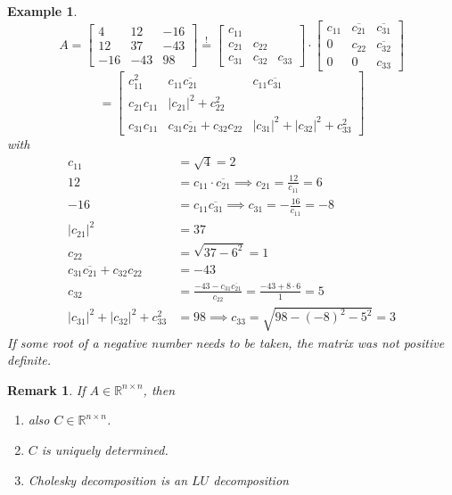\documentclass{article}
\newtheorem{example}{Example}  \numberwithin{example}{section}
\newtheorem{remark}{Remark}  \numberwithin{remark}{section}
\newcommand{\card}[1]{\left|#1\right|}
\begin{document}
\begin{example} %
  \[
    A = \begin{bmatrix} 4 & 12 & -16 \\ 12 & 37 & -43 \\ -16 & -43 & 98 \end{bmatrix}
    \overset!= \begin{bmatrix} c_{11} & & \\ c_{21} & c_{22} & \\ c_{31} & c_{32} & c_{33} \end{bmatrix} \cdot \begin{bmatrix} c_{11} & \overline{c_{21}} & \overline{c_{31}} \\ 0 & c_{22} & \overline{c_{32}} \\ 0 & 0 & c_{33} \end{bmatrix}
  \] \[
    = \begin{bmatrix} c_{11}^2 & c_{11} \overline{c_{21}} & c_{11} \overline{c_{31}} \\
    c_{21} c_{11} & \card{c_{21}}^2 + c_{22}^2 & \\
    c_{31} c_{11} & c_{31} \overline{c_{21}} + c_{32} c_{22} & \card{c_{31}}^2 + \card{c_{32}}^2 + c_{33}^2 \end{bmatrix}
  \]
  with
  \begin{align*}
    c_{11} &= \sqrt4 = 2 \\
    12 &= c_{11} \cdot \overline{c_{21}} \implies c_{21} = \frac{12}{c_{11}} = 6 \\
    -16 &= c_{11} \overline{c_{31}} \implies c_{31} = -\frac{16}{c_{11}} = -8 \\
    \card{c_{21}}^2 &= 37 \\
    c_{22} &= \sqrt{37 - 6^2} = 1 \\
    c_{31} \overline{c_{21}} + c_{32} c_{22} &= -43 \\
    c_{32} &= \frac{-43 - c_{31} \overline{c_21}}{c_{22}} = \frac{-43 + 8 \cdot 6}{1} = 5 \\
    \card{c_{31}}^2 + \card{c_{32}}^2 + c_{33}^2 &= 98 \implies c_{33} = \sqrt{98 - (-8)^2 - 5^2} = 3
  \end{align*}
  If some root of a negative number needs to be taken, the matrix was not positive definite.
\end{example}

\begin{remark} %
  If $A \in \mathbb R^{n \times n}$, then
  \begin{enumerate}
    \item also $C \in \mathbb R^{n \times n}$.
    \item $C$ is uniquely determined.
    \item Cholesky decomposition is an $LU$ decomposition
  \end{enumerate}
\end{remark}
\end{document}
